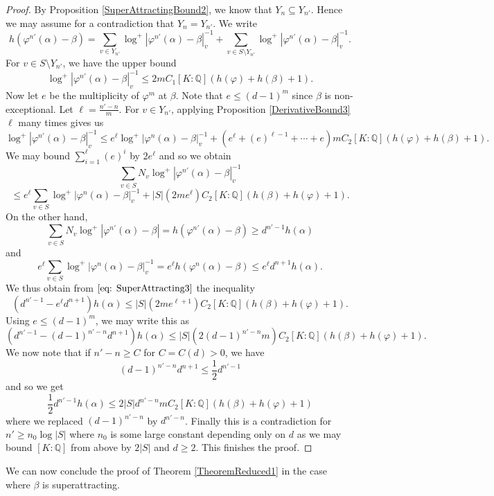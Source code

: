 \documentclass[10pt, reqno]{amsart}
\newcommand{\bb}{\mathbb}
\newcommand{\vphi}{\varphi}
\numberwithin{theorem}{section}
\numberwithin{equation}{section}
\numberwithin{example}{section}
\numberwithin{definition}{section}
\begin{document}
\begin{proof}
By Proposition \ref{SuperAttractingBound2}, we know that $Y_n \subseteq Y_{n'}$. Hence we may assume for a contradiction that $Y_n = Y_{n'}$. We write 
$$h(\vphi^{n'}(\alpha) - \beta) = \sum_{v \in Y_{n'}} \log^+|\vphi^{n'}(\alpha) - \beta|_v ^{-1} + \sum_{v \in S \setminus Y_{n'}} \log^+|\vphi^{n'}(\alpha) - \beta|^{-1}_v.$$
For $v \in S \setminus Y_{n'}$, we have the upper bound 
$$\log^+|\vphi^{n'}(\alpha) - \beta|_v^{-1} \leq 2m C_1[K:\bb{Q}](h(\vphi) + h(\beta)+1).$$
Now let $e$ be the multiplicity of $\vphi^m$ at $\beta$. Note that $e \leq (d-1)^m$ since $\beta$ is non-exceptional. Let $\ell = \frac{n'-n}{m}$. For $v \in Y_{n'}$, applying Proposition \ref{DerivativeBound3} $\ell$ many times gives us 
$$\log^+|\vphi^{n'}(\alpha) - \beta|_v^{-1} \leq e^{\ell} \log^+|\vphi^n(\alpha) - \beta|_v^{-1} + (e^{\ell} + (e)^{\ell-1} + \cdots + e)m C_2 [K:\bb{Q}](h(\vphi) + h(\beta)+1).$$
We may bound $\sum_{i=1}^{\ell} (e)^{i}$ by $2 e^{\ell}$ and so we obtain 
\begin{equation} \label{eq: SuperAttracting3}
\sum_{v \in S} N_v \log^+|\vphi^{n'}(\alpha) - \beta|^{-1}_v 
\end{equation}
$$\leq e^{\ell} \sum_{v \in S} \log^+|\vphi^n(\alpha) - \beta|^{-1}_v   + |S| (2m e^{\ell}) C_2 [K:\bb{Q}](h(\beta) + h(\vphi) +1).$$
On the other hand, 
$$\sum_{v \in S} N_v \log^+|\vphi^{n'}(\alpha) - \beta| = h(\vphi^{n'}(\alpha) - \beta) \geq d^{n'-1} h(\alpha)$$
and 
$$e^{\ell} \sum_{v \in S} \log^+|\vphi^n(\alpha) - \beta|^{-1}_v = e^{\ell} h(\vphi^n(\alpha) - \beta) \leq e^{\ell} d^{n+1} h(\alpha).$$
We thus obtain from $\eqref{eq: SuperAttracting3}$ the inequality 
$$\left(d^{n'-1} - e^{\ell} d^{n+1} \right) h(\alpha) \leq |S|(2 m e^{\ell + 1}) C_2 [K:\bb{Q}] (h(\beta) + h(\vphi) +1).$$
Using $e \leq (d-1)^m$, we may write this as 
$$\left(d^{n'-1} - (d-1)^{n'-n} d^{n+1} \right) h(\alpha) \leq |S| (2 (d-1)^{n'-n} m) C_2 [K:\bb{Q}] (h(\beta) + h(\vphi) +1).$$
We now note that if $n'-n \geq C$ for $C = C(d) > 0$, we have 
$$(d-1)^{n'-n} d^{n+1} \leq \frac{1}{2} d^{n'-1}$$
and so we get 
$$\frac{1}{2} d^{n'-1} h(\alpha) \leq  2 |S| d^{n'-n} m C_2 [K:\bb{Q}](h(\beta) + h(\vphi) + 1)$$
where we replaced $(d-1)^{n'-n} $ by $d^{n'-n} $. Finally this is a contradiction for $n' \geq n_0 \log |S|$ where $n_0$ is some large constant depending only on $d$ as we may bound $[K:\bb{Q}]$ from above by $2|S|$ and $d \geq 2$. This finishes the proof.
\end{proof}

We can now conclude the proof of Theorem \ref{TheoremReduced1} in the case where $\beta$ is superattracting. 
\end{document}
